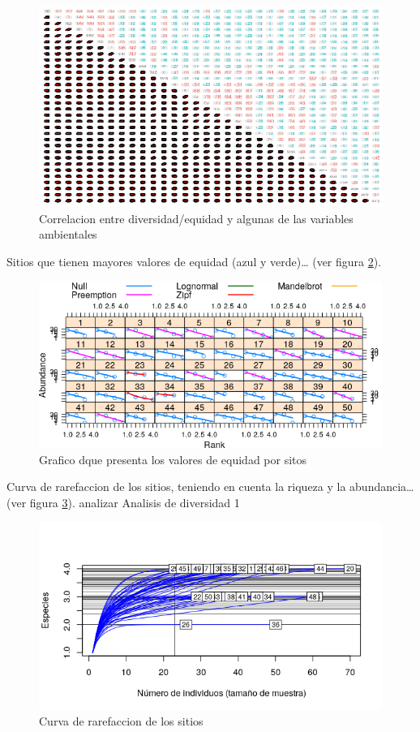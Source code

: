 \documentclass[11pt,]{article}
\begin{document}
\begin{figure}
\centering
\includegraphics[width=1.00000\textwidth]{correlacion_diversidad_equidad_actualizado.png}
\caption{Correlacion entre diversidad/equidad y algunas de las variables
ambientales \label{fig:correlacion_diversidad_equidad}}
\end{figure}

Sitios que tienen mayores valores de equidad (azul y verde)\ldots{} (ver
figura \ref{fig:grafico_niveles_equidad}).

\begin{figure}
\centering
\includegraphics{grafico_niveles_equidad.png}
\caption{Grafico dque presenta los valores de equidad por sitos
\label{fig:grafico_niveles_equidad}}
\end{figure}

Curva de rarefaccion de los sitios, teniendo en cuenta la riqueza y la
abundancia\ldots{}(ver figura \ref{fig:Curva_rarefaccion}). analizar
Analisis de diversidad 1

\begin{figure}
\centering
\includegraphics{Curva_rarefaccion.png}
\caption{Curva de rarefaccion de los sitios
\label{fig:Curva_rarefaccion}}
\end{figure}
\end{document}
